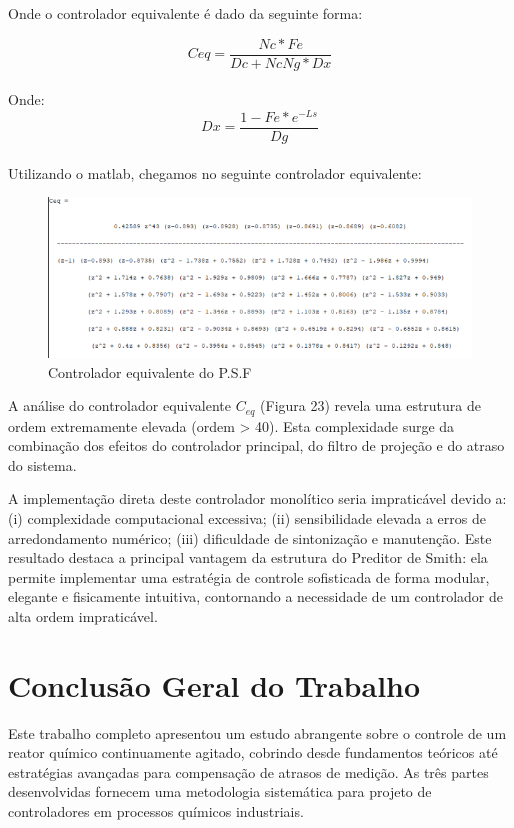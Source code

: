 \documentclass[a4paper,12pt]{article}
\begin{document}
Onde o controlador equivalente é dado da seguinte forma:

\begin{equation} 
Ceq = \frac{Nc*Fe}{Dc+NcNg*Dx} 
\end{equation}\\
Onde:\\
\begin{equation} 
Dx = \frac{1-Fe*e^{-Ls}}{Dg}
\end{equation}\\

Utilizando o matlab, chegamos no seguinte controlador equivalente:

\begin{figure} [H]
    \centering
    \includegraphics[width=0.9\linewidth]{image11.png}
    \caption{Controlador equivalente do P.S.F}
    \label{fig:enter-label}
\end{figure}

A análise do controlador equivalente $C_{eq}$ (Figura 23) revela uma estrutura de ordem extremamente elevada (ordem > 40). Esta complexidade surge da combinação dos efeitos do controlador principal, do filtro de projeção e do atraso do sistema.

A implementação direta deste controlador monolítico seria impraticável devido a: (i) complexidade computacional excessiva; (ii) sensibilidade elevada a erros de arredondamento numérico; (iii) dificuldade de sintonização e manutenção. Este resultado destaca a principal vantagem da estrutura do Preditor de Smith: ela permite implementar uma estratégia de controle sofisticada de forma modular, elegante e fisicamente intuitiva, contornando a necessidade de um controlador de alta ordem impraticável.


\section{Conclusão Geral do Trabalho}

Este trabalho completo apresentou um estudo abrangente sobre o controle de um reator químico continuamente agitado, cobrindo desde fundamentos teóricos até estratégias avançadas para compensação de atrasos de medição. As três partes desenvolvidas fornecem uma metodologia sistemática para projeto de controladores em processos químicos industriais.
\end{document}
